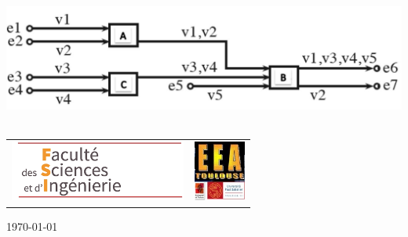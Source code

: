 \begin{titlepage}
\begin{center}
\vfill \includegraphics[width=.8\textwidth]{./page_de_garde/schema.jpg}~\\[1cm]

\vfill
\begin{tabular}{cc}
   \includegraphics[height=2cm]{./page_de_garde/logo_fsi.png} \hspace{2cm} &
    \hspace{2cm}
   \includegraphics[height=2cm]{./page_de_garde/logo_eea.jpg} \\
\end{tabular}

{\large \today}

\end{center}
\end{titlepage}

